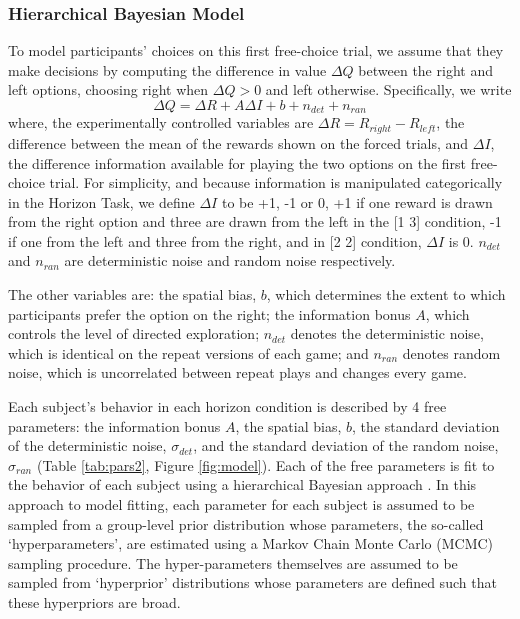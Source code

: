 \documentclass[12pt]{article}
\begin{document}
	\subsubsection*{Hierarchical Bayesian Model}
	
	To model participants' choices on this first free-choice trial, we assume that they make decisions by computing the difference in value $\Delta Q$ between the right and left options, choosing right when $\Delta Q > 0$ and left otherwise.  Specifically, we write
	\begin{equation}
	\Delta Q= \Delta R+A \Delta I+b+n_{det}+n_{ran}
	\end{equation}
	where, the experimentally controlled variables are $\Delta R=R_{right}-R_{left}$, the difference between the mean of the rewards shown on the forced trials, and $\Delta I$, the difference information available for playing the two options on the first free-choice trial. For simplicity, and because information is manipulated categorically in the Horizon Task, we define $\Delta I$ to be +1, -1 or 0, +1 if one reward is drawn from the right option and three are drawn from the left in the [1 3] condition, -1 if one from the left and three from the right, and in [2 2] condition, $\Delta I$ is 0. $n_{det}$ and $n_{ran}$ are deterministic noise and random noise respectively. 
	
	The other variables are: the spatial bias, $b$, which determines the extent to which participants prefer the option on the right; the information bonus $A$, which controls the level of directed exploration; $n_{det}$ denotes the deterministic noise, which is identical on the repeat versions of each game; and $n_{ran}$ denotes random noise, which is uncorrelated between repeat plays and changes every game.
	
	Each subject's behavior in each horizon condition is described by 4 free parameters: the information bonus $A$, the spatial bias, $b$, the standard deviation of the deterministic noise, $\sigma_{det}$, and the standard deviation of the random noise, $\sigma_{ran}$ (Table \ref{tab:pars2}, Figure \ref{fig:model}). Each of the free parameters is fit to the behavior of each subject using a hierarchical Bayesian approach \citep{hbm1}.  In this approach to model fitting, each parameter for each subject is assumed to be sampled from a group-level prior distribution whose parameters, the so-called `hyperparameters', are estimated using a Markov Chain Monte Carlo (MCMC) sampling procedure. The hyper-parameters themselves are assumed to be sampled from `hyperprior' distributions whose parameters are defined such that these hyperpriors are broad.  
	
\end{document}
